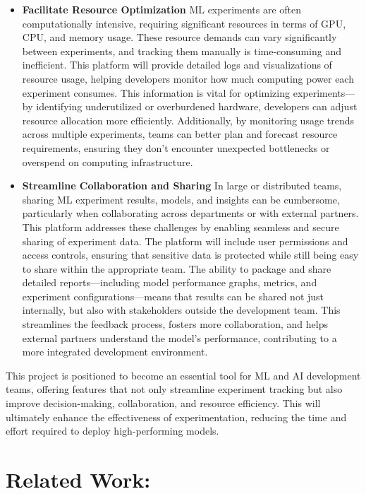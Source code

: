 \documentclass[12pt]{article}
\begin{document}
\begin{itemize}
\item \textbf{Facilitate Resource Optimization}
ML experiments are often computationally intensive, requiring significant resources in terms of GPU, CPU, and memory usage. These resource demands can vary significantly between experiments, and tracking them manually is time-consuming and inefficient. This platform will provide detailed logs and visualizations of resource usage, helping developers monitor how much computing power each experiment consumes. This information is vital for optimizing experiments—by identifying underutilized or overburdened hardware, developers can adjust resource allocation more efficiently. Additionally, by monitoring usage trends across multiple experiments, teams can better plan and forecast resource requirements, ensuring they don’t encounter unexpected bottlenecks or overspend on computing infrastructure\cite{derakhshan2019continuous}.

\item \textbf{Streamline Collaboration and Sharing}
In large or distributed teams, sharing ML experiment results, models, and insights can be cumbersome, particularly when collaborating across departments or with external partners. This platform addresses these challenges by enabling seamless and secure sharing of experiment data. The platform will include user permissions and access controls, ensuring that sensitive data is protected while still being easy to share within the appropriate team\cite{azure_ml}. The ability to package and share detailed reports—including model performance graphs, metrics, and experiment configurations—means that results can be shared not just internally, but also with stakeholders outside the development team. This streamlines the feedback process, fosters more collaboration, and helps external partners understand the model’s performance, contributing to a more integrated development environment.

\end{itemize}

This project is positioned to become an essential tool for ML and AI development teams, offering features that not only streamline experiment tracking but also improve decision-making, collaboration, and resource efficiency. This will ultimately enhance the effectiveness of experimentation, reducing the time and effort required to deploy high-performing models.

\section{Related Work:}
\end{document}
